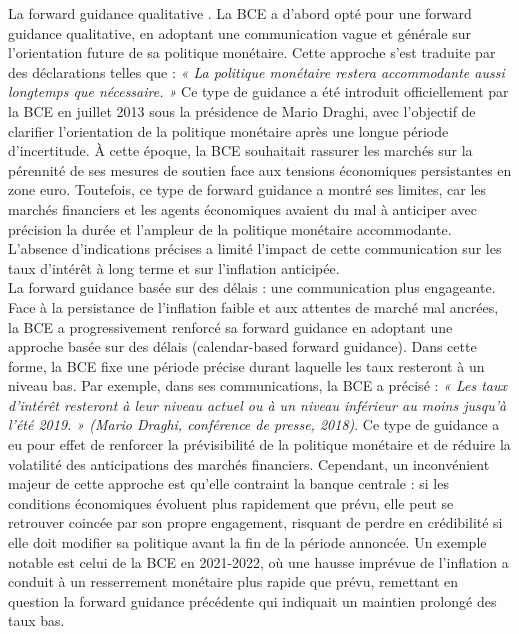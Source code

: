 La forward guidance qualitative \citep{blinder2017}. La BCE a d’abord opté pour une forward guidance qualitative, en adoptant une communication vague et générale sur l’orientation future de sa politique monétaire. Cette approche s'est traduite par des déclarations telles que : \textit{« La politique monétaire restera accommodante aussi longtemps que nécessaire. »} Ce type de guidance a été introduit officiellement par la BCE en juillet 2013 sous la présidence de Mario Draghi, avec l’objectif de clarifier l’orientation de la politique monétaire après une longue période d’incertitude. À cette époque, la BCE souhaitait rassurer les marchés sur la pérennité de ses mesures de soutien face aux tensions économiques persistantes en zone euro. Toutefois, ce type de forward guidance a montré ses limites, car les marchés financiers et les agents économiques avaient du mal à anticiper avec précision la durée et l’ampleur de la politique monétaire accommodante. L'absence d'indications précises a limité l’impact de cette communication sur les taux d’intérêt à long terme et sur l’inflation anticipée.\\

La forward guidance basée sur des délais \citep{blinder2017} : une communication plus engageante. Face à la persistance de l’inflation faible et aux attentes de marché mal ancrées, la BCE a progressivement renforcé sa forward guidance en adoptant une approche basée sur des délais (calendar-based forward guidance). Dans cette forme, la BCE fixe une période précise durant laquelle les taux resteront à un niveau bas. Par exemple, dans ses communications, la BCE a précisé : \textit{« Les taux d’intérêt resteront à leur niveau actuel ou à un niveau inférieur au moins jusqu’à l’été 2019. » (Mario Draghi, conférence de presse, 2018)}. Ce type de guidance a eu pour effet de renforcer la prévisibilité de la politique monétaire et de réduire la volatilité des anticipations des marchés financiers. Cependant, un inconvénient majeur de cette approche est qu’elle contraint la banque centrale : si les conditions économiques évoluent plus rapidement que prévu, elle peut se retrouver coincée par son propre engagement, risquant de perdre en crédibilité si elle doit modifier sa politique avant la fin de la période annoncée. Un exemple notable est celui de la BCE en 2021-2022, où une hausse imprévue de l’inflation a conduit à un resserrement monétaire plus rapide que prévu, remettant en question la forward guidance précédente qui indiquait un maintien prolongé des taux bas.\\

